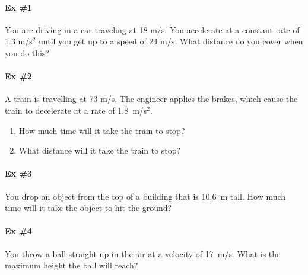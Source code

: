 \documentclass[12pt]{article}
\begin{document}
\pagestyle{empty}

\paragraph{Ex \#1} 

You are driving in a car traveling at 18 m/s.  You accelerate at a constant rate of 1.3 m/s$^2$ until you get up to a speed of 24 m/s.  What distance do you cover when you do this?

\pagebreak

\paragraph{Ex \#2} 

A train is travelling at 73 m/s.  The engineer applies the brakes, which cause the train to decelerate at a rate of 1.8~m/s$^2$.

\begin{enumerate}[label=\alph*.)]
  \item How much time will it take the train to stop?
  \item What distance will it take the train to stop?
\end{enumerate}


\pagebreak

\paragraph{Ex \#3} 

You drop an object from the top of a building that is 10.6~m tall.  How much time will it take the object to hit the ground?


\pagebreak

\paragraph{Ex \#4} 

You throw a ball straight up in the air at a velocity of 17~m/s.  What is the maximum height the ball will reach?
\end{document}
